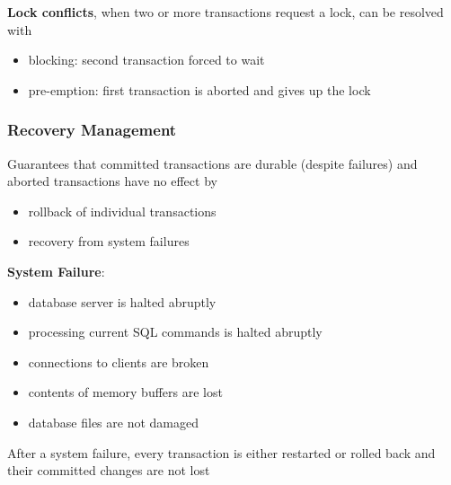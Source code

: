 \documentclass[]{article}
\theoremstyle{definition}
\begin{document}
	\textbf{Lock conflicts}, when two or more transactions request a lock, can be resolved with
	\begin{itemize}
		\item blocking: second transaction forced to wait
		\item pre-emption: first transaction is aborted and gives up the lock
	\end{itemize}

	\subsubsection{Recovery Management}
	Guarantees that committed transactions are durable (despite failures) and aborted transactions have no effect by
	\begin{itemize}
		\item rollback of individual transactions
		\item recovery from system failures
	\end{itemize}
	\textbf{System Failure}:
	\begin{itemize}
		\item database server is halted abruptly
		\item processing current SQL commands is halted abruptly
		\item connections to clients are broken
		\item contents of memory buffers are lost
		\item database files are not damaged
	\end{itemize}
	After a system failure, every transaction is either restarted or rolled back and their committed changes are not lost \\
\end{document}
